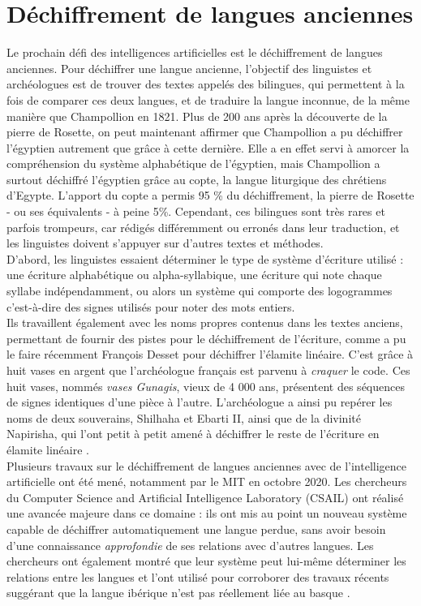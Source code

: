 \documentclass[12pt, french, twoside]{report}
\begin{document}
\section{Déchiffrement de langues anciennes}
Le prochain défi des intelligences artificielles est le déchiffrement de langues anciennes.  Pour déchiffrer une langue ancienne, l'objectif des linguistes et archéologues est de trouver des textes appelés des \og bilingues\fg, qui permettent à la fois de comparer ces deux langues, et de traduire la langue inconnue, de la même manière que Champollion en 1821. Plus de 200 ans après la découverte de la pierre de Rosette, on peut maintenant affirmer que Champollion a pu déchiffrer l'égyptien autrement que grâce à cette dernière.  Elle a en effet servi à amorcer la compréhension du système alphabétique de l'égyptien, mais Champollion a surtout déchiffré l'égyptien grâce au copte, la langue liturgique des chrétiens d'Egypte. L'apport du copte a permis 95 \% du déchiffrement, la pierre de Rosette - ou ses équivalents - à peine 5\%. Cependant, ces bilingues sont très rares et parfois trompeurs, car rédigés différemment ou erronés dans leur traduction, et les linguistes doivent s'appuyer sur d'autres textes et méthodes.\\
\indent D'abord, les linguistes essaient déterminer le type de système d'écriture utilisé : une écriture alphabétique ou alpha-syllabique, une écriture qui note chaque syllabe indépendamment, ou alors un système qui comporte des logogrammes c'est-à-dire des signes utilisés pour noter des mots entiers.\\ %
\indent Ils travaillent également avec les noms propres contenus dans les textes anciens, permettant de fournir des pistes pour le déchiffrement de l'écriture, comme a pu le faire récemment François Desset pour déchiffrer l'élamite linéaire. C'est grâce à huit vases en argent que l'archéologue français est parvenu à \textit{craquer} le code. Ces huit vases, nommés \textit{vases Gunagis}, vieux de 4 000 ans, présentent des séquences de signes identiques d'une pièce à l'autre. L'archéologue a ainsi pu repérer les noms de deux souverains, Shilhaha et Ebarti II, ainsi que de la divinité Napirisha, qui l'ont petit à petit amené à déchiffrer le reste de l'écriture en élamite linéaire \cite{linear-elamite-writing}.\\

Plusieurs travaux sur le déchiffrement de langues anciennes avec de l'intelligence artificielle ont été mené, notamment par le MIT en octobre 2020. Les chercheurs du Computer Science and Artificial Intelligence Laboratory (CSAIL) ont réalisé une avancée majeure dans ce domaine \cite{luo-et-al-2020} : ils ont mis au point un nouveau système capable de déchiffrer automatiquement une langue perdue, sans avoir besoin d'une connaissance \textit{approfondie} de ses relations avec d'autres langues. Les chercheurs ont également montré que leur système peut lui-même déterminer les relations entre les langues et l'ont utilisé pour corroborer des travaux récents suggérant que la langue ibérique n'est pas réellement liée au basque \cite{deepmind2022}.\\
\end{document}
